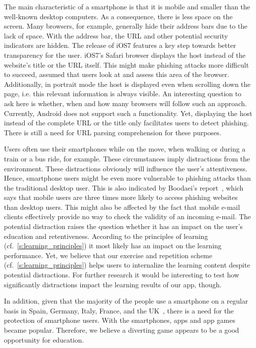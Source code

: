\begin{description}[leftmargin=0cm]
	\item[Mobility and Size:] The main characteristic of a smartphone is that it is mobile and smaller than the well-known desktop computers.
 As a consequence, there is less space on the screen.
 Many browsers, for example, generally hide their address bars due to the lack of space.
 With the address bar, the URL and other potential security indicators are hidden.
The release of iOS7 features a key step towards better transparency for the user.
iOS7's Safari browser displays the host instead of the website's title or the URL itself.
This might make phishing attacks more difficult to succeed, assumed that users look at and assess this area of the browser.
Additionally, in portrait mode the host is displayed even when scrolling down the page, i.e. this relevant information is always visible.
An interesting question to ask here is whether, when and how many browsers will follow such an approach.
Currently, Android does not support such a functionality. 
Yet, displaying the host instead of the complete URL or the title only facilitates users to detect phishing.
There is still a need for URL parsing comprehension for these purposes.
	\item[Distraction Caused by Mobility:] Users often use their smartphones while on the move, when walking or during a train or a bus ride, for example.
 These circumstances imply distractions from the environment.
 These distractions obviously will influence the user's attentiveness.
 Hence, smartphone users might be even more vulnerable to phishing attacks than the traditional desktop user.
 This is also indicated by Boodaei's report~\cite{trusteer2011}, which says that mobile users are three times more likely to access phishing websites than desktop users.
 This might also be affected by the fact that mobile e-mail clients effectively provide no way to check the validity of an incoming e-mail.
The potential distraction raises the question whether it has an impact on the user's education and retentiveness.
According to the principles of learning (cf.~\autoref{s:learning_principles}) it most likely has an impact on the learning performance.
Yet, we believe that our exercise and repetition scheme (cf.~\autoref{s:learning_principles}) helps users to internalize the learning content despite potential distractions.
For further research it would be interesting to test how significantly distractions impact the learning results of our app, though.
	\item[High Number of Smartphone Users:] In addition, given that the majority of the people use a smartphone on a regular basis in Spain, Germany, Italy, France, and the UK~\cite{smartphoneusage}, there is a need for the protection of smartphone users.
With the smartphones, apps and app games became popular.
Therefore, we believe a diverting game appears to be a good opportunity for education.

\end{description} 
